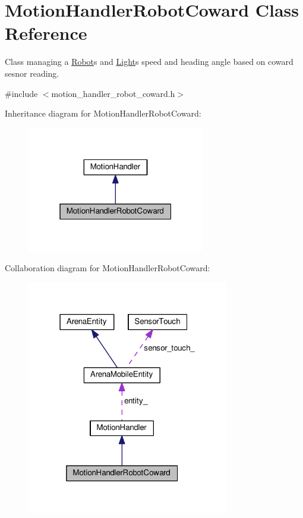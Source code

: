 \hypertarget{classMotionHandlerRobotCoward}{}\section{Motion\+Handler\+Robot\+Coward Class Reference}
\label{classMotionHandlerRobotCoward}


Class managing a \hyperlink{classRobot}{Robot}\textquotesingle{}s and \hyperlink{classLight}{Light}\textquotesingle{}s speed and heading angle based on coward sesnor reading.  




{\ttfamily \#include $<$motion\+\_\+handler\+\_\+robot\+\_\+coward.\+h$>$}



Inheritance diagram for Motion\+Handler\+Robot\+Coward\+:\nopagebreak
\begin{figure}[H]
\begin{center}
\leavevmode
\includegraphics[width=220pt]{classMotionHandlerRobotCoward__inherit__graph}
\end{center}
\end{figure}


Collaboration diagram for Motion\+Handler\+Robot\+Coward\+:\nopagebreak
\begin{figure}[H]
\begin{center}
\leavevmode
\includegraphics[width=250pt]{classMotionHandlerRobotCoward__coll__graph}
\end{center}
\end{figure}
